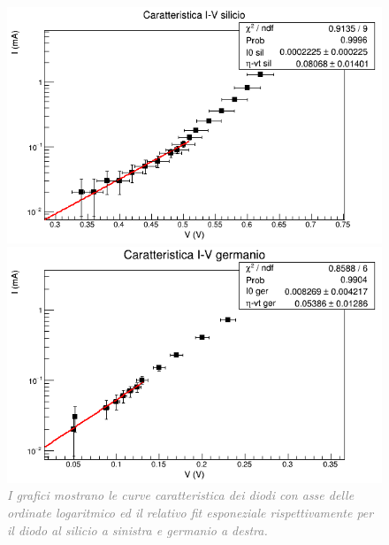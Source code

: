 \documentclass[a4paper,11pt]{article}
\begin{document}
\begin{figure}[H]
    \centering
    \begin{minipage}{0.48\textwidth}
        \includegraphics[width=\textwidth]{pictures/silicio.png}
        \caption{\textit{\textcolor{gray}{ }}}
        \label{graph::silicio}
    \end{minipage}
    \hfill
    \begin{minipage}{0.48\textwidth}
        \includegraphics[width=\textwidth]{pictures/germanio.png}
        \caption{\textit{\textcolor{gray}{ }}}
        \label{graph::germanio}
    \end{minipage}
    \caption{\textit{\textcolor{gray}{I grafici mostrano le curve caratteristica dei diodi con asse delle ordinate logaritmico ed il relativo fit esponeziale rispettivamente per il diodo al silicio a sinistra e germanio a destra.}}}
\end{figure}
\end{document}
